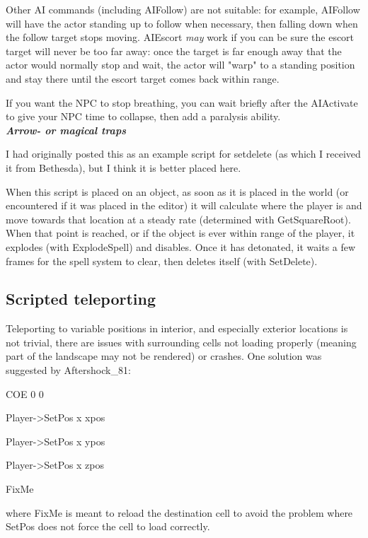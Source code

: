 \documentclass[
]{article}
\begin{document}
Other AI commands (including AIFollow) are not suitable: for example,
AIFollow will have the actor standing up to follow when necessary, then
falling down when the follow target stops moving. AIEscort \emph{may}
work if you can be sure the escort target will never be too far away:
once the target is far enough away that the actor would normally stop
and wait, the actor will "warp" to a standing position and stay there
until the escort target comes back within range.

If you want the NPC to stop breathing, you can wait briefly after the
AIActivate to give your NPC time to collapse, then add a paralysis
ability.\\
\emph{\textbf{Arrow- or magical traps}}

I had originally posted this as an example script for setdelete (as
which I received it from Bethesda), but I think it is better placed
here.

When this script is placed on an object, as soon as it is placed in the
world (or encountered if it was placed in the editor) it will calculate
where the player is and move towards that location at a steady rate
(determined with GetSquareRoot). When that point is reached, or if the
object is ever within range of the player, it explodes (with
ExplodeSpell) and disables. Once it has detonated, it waits a few frames
for the spell system to clear, then deletes itself (with SetDelete).



\hypertarget{scripted-teleporting}{%
\subsection{Scripted teleporting}\label{scripted-teleporting}}

Teleporting to variable positions in interior, and especially exterior
locations is not trivial, there are issues with surrounding cells not
loading properly (meaning part of the landscape may not be rendered) or
crashes. One solution was suggested by Aftershock\_81:

COE 0 0

Player-\textgreater SetPos x xpos

Player-\textgreater SetPos x ypos

Player-\textgreater SetPos x zpos

FixMe

where FixMe is meant to reload the destination cell to avoid the problem
where SetPos does not force the cell to load correctly.
\end{document}
